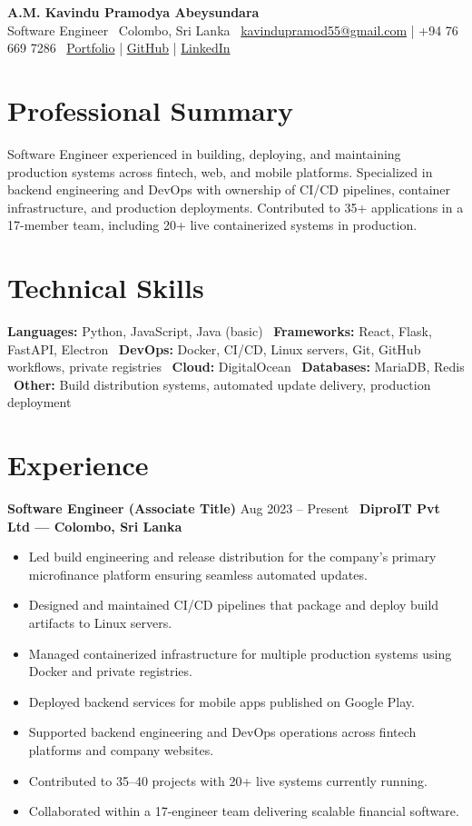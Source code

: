 \documentclass[10pt,a4paper]{article}
\begin{document}
{\LARGE \textbf{A.M. Kavindu Pramodya Abeysundara}} \\[2pt]
Software Engineer \
Colombo, Sri Lanka \
\href{mailto:kavindupramod55@gmail.com}{kavindupramod55@gmail.com} \quad | \quad +94 76 669 7286 \
\href{https://kavindupramod.netlify.app/}{Portfolio} \quad | \quad \href{https://github.com/KavinduPramod}{GitHub} \quad | \quad \href{https://linkedin.com/in/kavindupramod/}{LinkedIn}

\section*{Professional Summary}
Software Engineer experienced in building, deploying, and maintaining production systems across fintech, web, and mobile platforms. Specialized in backend engineering and DevOps with ownership of CI/CD pipelines, container infrastructure, and production deployments. Contributed to 35+ applications in a 17-member team, including 20+ live containerized systems in production.

\section*{Technical Skills}
\textbf{Languages:} Python, JavaScript, Java (basic) \
\textbf{Frameworks:} React, Flask, FastAPI, Electron \
\textbf{DevOps:} Docker, CI/CD, Linux servers, Git, GitHub workflows, private registries \
\textbf{Cloud:} DigitalOcean \
\textbf{Databases:} MariaDB, Redis \
\textbf{Other:} Build distribution systems, automated update delivery, production deployment

\section*{Experience}
\textbf{Software Engineer (Associate Title)} \hfill Aug 2023 -- Present \
\textbf{DiproIT Pvt Ltd — Colombo, Sri Lanka}
\begin{itemize}
\item Led build engineering and release distribution for the company's primary microfinance platform ensuring seamless automated updates.
\item Designed and maintained CI/CD pipelines that package and deploy build artifacts to Linux servers.
\item Managed containerized infrastructure for multiple production systems using Docker and private registries.
\item Deployed backend services for mobile apps published on Google Play.
\item Supported backend engineering and DevOps operations across fintech platforms and company websites.
\item Contributed to 35--40 projects with 20+ live systems currently running.
\item Collaborated within a 17-engineer team delivering scalable financial software.
\end{itemize}
\end{document}
